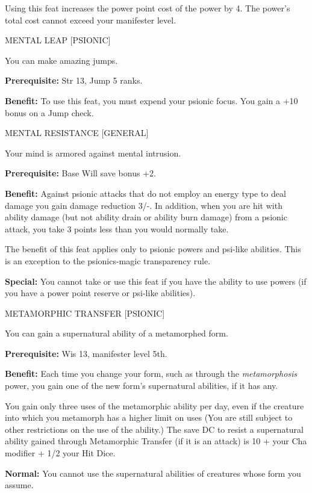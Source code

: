 \documentclass{article}
\begin{document}
Using this feat increases the power point cost of the power by 4. The power's total 
cost cannot exceed your manifester level.

\vspace{12pt}
MENTAL LEAP [PSIONIC]

You can make amazing jumps.

\textbf{Prerequisite:} Str 13, Jump 5 ranks.

\textbf{Benefit:} To use this feat, you must expend your psionic focus. You gain 
a +10 bonus on a Jump check. 

\vspace{12pt}
MENTAL RESISTANCE [GENERAL]

Your mind is armored against mental intrusion.

\textbf{Prerequisite:} Base Will save bonus +2.

\textbf{Benefit:} Against psionic attacks that do not employ an energy type to 
deal damage you gain damage reduction 3/-. In addition, when you are hit with ability 
damage (but not ability drain or ability burn damage) from a psionic attack, you 
take 3 points less than you would normally take.

The benefit of this feat applies only to psionic powers and psi-like abilities. 
This is an exception to the psionics-magic transparency rule.

\textbf{Special:} You cannot take or use this feat if you have the ability to use 
powers (if you have a power point reserve or psi-like abilities).

\vspace{12pt}
METAMORPHIC TRANSFER [PSIONIC]

You can gain a supernatural ability of a metamorphed form.

\textbf{Prerequisite:} Wis 13, manifester level 5th.

\textbf{Benefit:} Each time you change your form, such as through the \textit{metamorphosis 
}power, you gain one of the new form's supernatural abilities, if it has any.

You gain only three uses of the metamorphic ability per day, even if the creature 
into which you metamorph has a higher limit on uses (You are still subject to other 
restrictions on the use of the ability.) The save DC to resist a supernatural ability 
gained through Metamorphic Transfer (if it is an attack) is 10 + your Cha modifier 
+ 1/2 your Hit Dice.

\textbf{Normal:} You cannot use the supernatural abilities of creatures whose form 
you assume.
\end{document}
